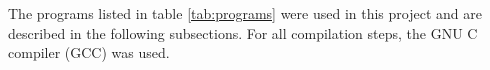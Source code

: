 \label{sec:programs}
The programs listed in table \ref{tab:programs} were used in this project and
are described in the following subsections. For all compilation steps, the GNU C
compiler (GCC) was used.



